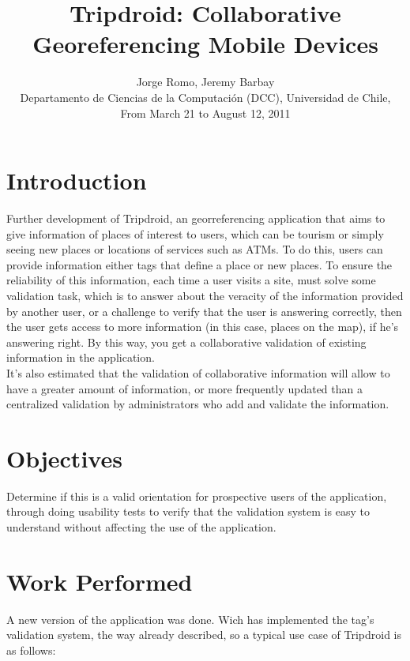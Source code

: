 \documentclass{sig-alternate}
\newcommand{\Title}{Tripdroid: Collaborative Georeferencing Mobile Devices}
\newcommand{\Authors}{Jorge Romo, Jeremy Barbay}
\begin{document}
\title{\Title}

\author{\Authors \\[1mm]
Departamento de Ciencias de la Computación (DCC), Universidad de Chile, \\[1mm] From March 21 to August 12, 2011
}

\maketitle

\section{Introduction}

Further development of Tripdroid, an georreferencing application that aims to give information of places of interest to users, which can be tourism or simply seeing new places or locations of services such as ATMs. To do this, users can provide information either tags that define a place or new places. To ensure the reliability of this information, each time a user visits a site, must solve some validation task, which is to answer about the veracity of the information provided by another user, or a challenge to verify that the user is answering correctly, then the user gets access to more information (in this case, places on the map), if he's answering right. By this way, you get a collaborative validation of existing information in the application.\\

It's also estimated that the validation of collaborative information will allow to have a greater amount of information, or more frequently updated than a centralized validation by administrators who add and validate the information.

\section{Objectives}

Determine if this is a valid orientation for prospective users of the application, through doing usability tests to verify that the validation system is easy to understand without affecting the use of the application.

\section{Work Performed}

A new version of the application was done. Wich has implemented the tag's validation system, the way already described, so a typical use case of Tripdroid is as follows:\\
\end{document}
